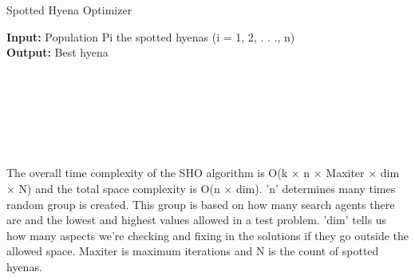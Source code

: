 \documentclass[12pt]{article}
\begin{document}
\begin{algorithm}
\caption{Spotted Hyena Optimizer}\label{alg:cap}
\textbf{Input:} Population Pi the spotted hyenas (i = 1, 2, . . ., n)\\
\textbf{Output:} Best hyena\\\\
\\
\\
\\
\\
\\
\end{algorithm}

The overall time complexity of the SHO algorithm is O(k × n × Maxiter × dim × N) and the total space complexity is O(n × dim). 'n' determines many times random group is created. This group is based on how many search agents there are and the lowest and highest values allowed in a test problem. 'dim' tells us how many aspects we're checking and fixing in the solutions if they go outside the allowed space. Maxiter is maximum iterations and N is the count of spotted hyenas.
\end{document}
